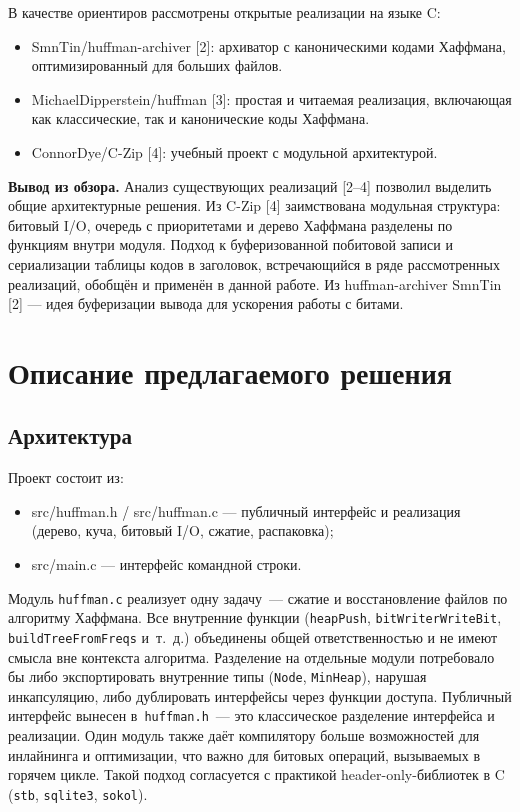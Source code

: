 \documentclass[a4paper]{article}
\begin{document}
В качестве ориентиров рассмотрены открытые реализации на языке C:

\begin{itemize}
    \item SmnTin/huffman-archiver [2]: архиватор с каноническими кодами Хаффмана, оптимизированный для больших файлов.
    \item MichaelDipperstein/huffman [3]: простая и читаемая реализация, включающая как классические, так и канонические коды Хаффмана.
    \item ConnorDye/C-Zip [4]: учебный проект с модульной архитектурой.
\end{itemize}

\textbf{Вывод из обзора.} Анализ существующих реализаций [2–4] позволил выделить общие архитектурные решения. 
Из C-Zip [4] заимствована модульная структура: битовый I/O, очередь с приоритетами и дерево Хаффмана 
разделены по функциям внутри модуля. Подход к буферизованной побитовой записи и сериализации таблицы кодов в заголовок, 
встречающийся в ряде рассмотренных реализаций, обобщён и применён в данной работе.
Из huffman-archiver SmnTin [2] — идея буферизации вывода для ускорения работы с битами.

\section{Описание предлагаемого решения}

\subsection{Архитектура}

Проект состоит из:

\begin{itemize}
    \item src/huffman.h / src/huffman.c — публичный интерфейс и реализация (дерево, куча, битовый I/O, сжатие, распаковка);
    \item src/main.c — интерфейс командной строки.
\end{itemize}

Модуль \texttt{huffman.c} реализует одну задачу~--- сжатие
и восстановление файлов по алгоритму Хаффмана. Все внутренние
функции (\texttt{heapPush}, \texttt{bitWriterWriteBit},
\texttt{buildTreeFromFreqs} и~т.~д.) объединены общей
ответственностью и не имеют смысла вне контекста алгоритма.
Разделение на отдельные модули потребовало бы либо экспортировать
внутренние типы (\texttt{Node}, \texttt{MinHeap}), нарушая
инкапсуляцию, либо дублировать интерфейсы через функции доступа.
Публичный интерфейс вынесен в~\texttt{huffman.h}~--- это
классическое разделение интерфейса и реализации. Один модуль
также даёт компилятору больше возможностей для инлайнинга
и оптимизации, что важно для битовых операций, вызываемых
в горячем цикле. Такой подход согласуется с практикой
header-only-библиотек в C (\texttt{stb}, \texttt{sqlite3},
\texttt{sokol}).
\end{document}
